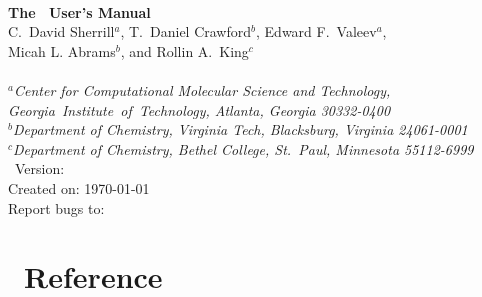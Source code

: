 \documentclass[12pt]{article}
\begin{document}


\begin{center}
\ \\
\vspace{2.0in}
{\bf {\Large The \PSIthree\ User's Manual}} \\
\vspace{0.5in}
C.~David Sherrill$^a$, T.~Daniel Crawford$^b$, Edward F.~Valeev$^a$, \\
Micah L. Abrams$^b$, and Rollin A.~King$^c$ \\
\ \\
{\em $^a$Center for Computational Molecular Science and Technology, 
  \mbox{Georgia Institute of Technology,} Atlanta, Georgia 30332-0400} \\
\vspace{0.1in}
{\em $^b$Department of Chemistry, Virginia Tech, Blacksburg, Virginia 
  24061-0001} \\
\vspace{0.1in}
{\em $^c$Department of Chemistry, Bethel College, St.\ Paul, Minnesota 
  55112-6999}
\ \\
\vspace{0.3in}
\PSIthree\ Version: \PSIversion \\
Created on: \today \\
Report bugs to: \PSIemail \\
\end{center}

\thispagestyle{empty}

\newpage
\tableofcontents
\newpage





  
  
  
  
  




\appendix
\section{\PSIthree\ Reference}\label{PSI_Reference}


%



\end{document}
